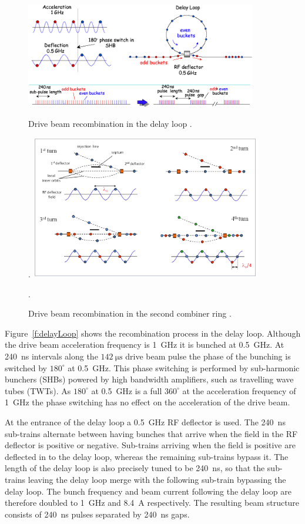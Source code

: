 \begin{figure}
  \centering
  \includegraphics[width=0.9\textwidth]{Figures/introduction/delayLoop}
  \caption{Drive beam recombination in the delay loop \cite{clicCDR}.}.
  \label{f:delayLoop}
    \includegraphics[width=0.9\textwidth]{Figures/introduction/combinerRing}
  \caption{Drive beam recombination in the second combiner ring \cite{clicCDR}.}.
  \label{f:combinerRing}
\end{figure}

Figure~\ref{f:delayLoop} shows the recombination process in the delay loop. Although the drive beam acceleration frequency is 1~GHz it is bunched at 0.5~GHz. At 240~ns intervals along the \(142~\mathrm{\mu s}\) drive beam pulse the phase of the bunching is switched by \(180^\circ\) at 0.5~GHz. This phase switching is performed by sub-harmonic bunchers (SHBs) powered by high bandwidth amplifiers, such as travelling wave tubes (TWTs). As \(180^\circ\) at 0.5~GHz is a full \(360^\circ\) at the acceleration frequency of 1~GHz the phase switching has no effect on the acceleration of the drive beam. 

At the entrance of the delay loop a 0.5~GHz RF deflector is used. The 240~ns sub-trains alternate between having bunches that arrive when the field in the RF deflector is positive or negative. Sub-trains arriving when the field is positive are deflected in to the delay loop, whereas the remaining sub-trains bypass it. The length of the delay loop is also precisely tuned to be 240~ns, so that the sub-trains leaving the delay loop merge with the following sub-train bypassing the delay loop. The bunch frequency and beam current following the delay loop are therefore doubled to 1~GHz and 8.4~A respectively. The resulting beam structure consists of 240~ns pulses separated by 240~ns gaps.

